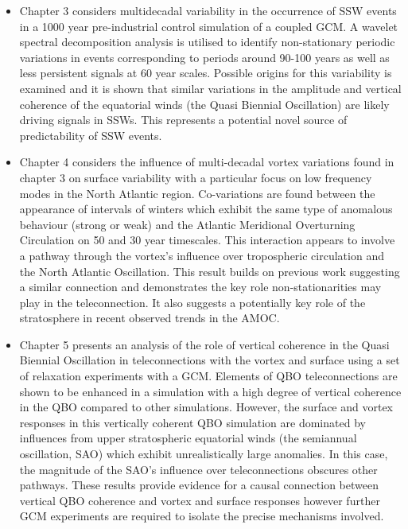 \begin{itemize}
    \item Chapter 3 considers multidecadal variability in the occurrence of SSW events in a 1000 year pre-industrial control simulation of a coupled GCM. A wavelet spectral decomposition analysis is utilised to identify non-stationary periodic variations in events corresponding to periods around 90-100 years as well as less persistent signals at 60 year scales. Possible origins for this variability is examined and it is shown that similar variations in the amplitude and vertical coherence of the equatorial winds (the Quasi Biennial Oscillation) are likely driving signals in SSWs. This represents a potential novel source of predictability of SSW events.
    
    \item Chapter 4 considers the influence of multi-decadal vortex variations found in chapter 3 on surface variability with a particular focus on low frequency modes in the North Atlantic region. Co-variations are found between the appearance of intervals of winters which exhibit the same type of anomalous behaviour (strong or weak) and the Atlantic Meridional Overturning Circulation on 50 and 30 year timescales. This interaction appears to involve a pathway through the vortex's influence over tropospheric circulation and the North Atlantic Oscillation. This result builds on previous work suggesting a similar connection and demonstrates the key role non-stationarities may play in the teleconnection. It also suggests a potentially key role of the stratosphere in recent observed trends in the AMOC. 
    
    \item Chapter 5 presents an analysis of the role of vertical coherence in the Quasi Biennial Oscillation in teleconnections with the vortex and surface using a set of relaxation experiments with a GCM. Elements of QBO teleconnections are shown to be enhanced in a simulation with a high degree of vertical coherence in the QBO compared to other simulations. However, the surface and vortex responses in this vertically coherent QBO simulation are dominated by influences from upper stratospheric equatorial winds (the semiannual oscillation, SAO) which exhibit unrealistically large anomalies. In this case, the magnitude of the SAO's influence over teleconnections obscures other pathways. These results provide evidence for a causal connection between vertical QBO coherence and vortex and surface responses however further GCM experiments are required to isolate the precise mechanisms involved.  
\end{itemize}

